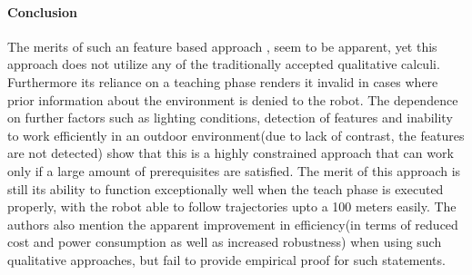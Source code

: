 	\paragraph{Conclusion}The merits of such an feature based approach \cite{chen2006qualitative}, seem to be apparent, yet this approach does not utilize any of the traditionally accepted qualitative calculi. Furthermore its reliance on a teaching phase renders it invalid in cases where prior information about the environment is denied to the robot. The dependence on further factors such as lighting conditions, detection of features and inability to work efficiently in an outdoor environment(due to lack of contrast, the features are not detected) show that this is a highly constrained approach that can work only if a large amount of prerequisites are satisfied. The merit of this approach is still its ability to function exceptionally well when the teach phase is executed properly, with the robot able to follow trajectories upto a 100 meters easily. The authors also mention the apparent improvement in efficiency(in terms of 	reduced cost and power consumption as well as increased robustness) when using such qualitative approaches,  but fail to provide empirical proof for such statements.
	
